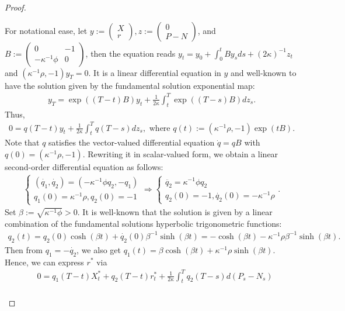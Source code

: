 \documentclass[openany,oneside]{article}
\theoremstyle{definition}
\theoremstyle{remark}
\begin{document}
\begin{proof}
\begin{enumerate}[Step 1.]
For notational ease, let $y:=\begin{pmatrix} X \\ r\end{pmatrix}, z:=\begin{pmatrix} 0 \\ P-N\end{pmatrix}$, and $B:=\begin{pmatrix} 0 & -1 \\ -\kappa^{-1}\phi & 0\end{pmatrix}$, then the equation reads $y_t = y_0 + \int_0^t B y_s ds + (2\kappa)^{-1}z_t$ and $(\kappa^{-1}\rho, -1)y_T = 0$. It is a linear differential equation in $y$ and well-known to have the solution given by the fundamental solution exponential map:
\begin{align*}
y_T = \exp((T-t)B)y_t + \frac{1}{2\kappa} \int_t^T \exp((T-s)B) dz_s.
\end{align*}
Thus,
\begin{align*}
0 = q(T-t)y_t + \frac{1}{2\kappa}\int_t^T q(T-s) dz_s, \textrm{ where } q(t):=(\kappa^{-1}\rho, -1)\exp(tB).
\end{align*}
Note that $q$ satisfies the vector-valued differential equation $\dot{q}=qB$ with $q(0)=(\kappa^{-1}\rho, -1)$. Rewriting it in scalar-valued form, we obtain a linear second-order differential equation as follows:
\begin{align*}
\begin{cases} (\dot{q_1},\dot{q_2})=(-\kappa^{-1}\phi q_2, -q_1) \\ q_1(0)=\kappa^{-1}\rho, q_2(0)=-1 \end{cases}
\Rightarrow \begin{cases}
\ddot{q_2}=\kappa^{-1}\phi q_2 \\ q_2(0)=-1, \dot{q_2}(0)=-\kappa^{-1}\rho
\end{cases}.
\end{align*}
Set $\beta:=\sqrt{\kappa^{-1}\phi}>0$. It is well-known that the solution is given by a linear combination of the fundamental solutions hyperbolic trigonometric functions:
\begin{align*}
q_2(t)=q_2(0)\cosh(\beta t)+\dot{q_2}(0)\beta^{-1}\sinh(\beta t) = -\cosh(\beta t)-\kappa^{-1}\rho\beta^{-1}\sinh(\beta t).
\end{align*}
Then from $q_1=-\dot{q_2}$, we also get $q_1(t)=\beta\cosh(\beta t)+\kappa^{-1}\rho\sinh(\beta t)$. Hence, we can express $r^\ast$ via
\begin{align*}
& 0=q_1(T-t)X^\ast_t+q_2(T-t)r^\ast_t+\frac{1}{2\kappa}\int_t^T q_2(T-s) d(P_s-N_s) \\

\end{align*}
\end{enumerate}
\end{proof}
\end{document}
